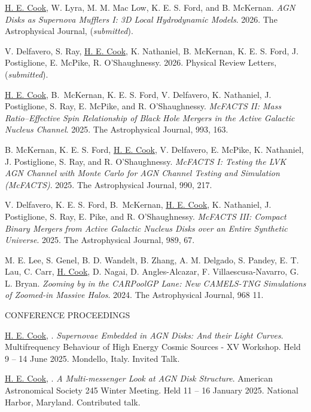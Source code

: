 \hangindent=0.5in \noindent \underline{H. E. Cook}, W. Lyra, M. M. Mac Low, K. E. S. Ford, and B. McKernan. \textit{AGN Disks as Supernova Mufflers I: 3D Local Hydrodynamic Models}. 2026. The Astrophysical Journal, (\textit{submitted}).

\hangindent=0.5in \noindent V. Delfavero, S. Ray, \underline{H. E. Cook}, K. Nathaniel, B. McKernan, K. E. S. Ford, J. Postiglione, E. McPike, R. O'Shaughnessy. 2026. Physical Review Letters, (\textit{submitted}).

\hangindent=0.5in \noindent \underline{H. E. Cook}, B.~McKernan, K. E. S. Ford, V. Delfavero, K. Nathaniel, J. Postiglione, S. Ray, E. McPike, and R. O'Shaughnessy. \textit{McFACTS II: Mass Ratio--Effective Spin Relationship of Black Hole Mergers in the Active Galactic Nucleus Channel}. 2025. The Astrophysical Journal, 993, 163.

\hangindent=0.5in \noindent  B. McKernan, K. E. S. Ford, \underline{H. E. Cook}, V. Delfavero, E. McPike, K. Nathaniel, J. Postiglione, S. Ray, and R. O'Shaughnessy. \textit{McFACTS I: Testing the LVK AGN Channel with Monte Carlo for AGN Channel Testing and Simulation (McFACTS)}. 2025. The Astrophysical Journal, 990, 217.

\hangindent=0.5in \noindent V. Delfavero, K. E. S. Ford, B.~McKernan, \underline{H. E. Cook}, K. Nathaniel, J. Postiglione, S. Ray, E. Pike, and R. O'Shaughnessy. \textit{McFACTS III: Compact Binary Mergers from Active Galactic Nucleus Disks over an Entire Synthetic Universe}. 2025. The Astrophysical Journal, 989, 67.

\hangindent=0.5in \noindent M. E. Lee, S. Genel, B. D. Wandelt, B. Zhang, A. M. Delgado, S. Pandey, E. T. Lau, C. Carr, \underline{H. Cook}, D. Nagai, D. Angles-Alcazar, F. Villaescusa-Navarro, G. L. Bryan. \textit{Zooming by in the CARPoolGP Lane: New CAMELS-TNG Simulations of Zoomed-in Massive Halos}. 2024. The Astrophysical Journal, 968 11.

\begin{center}
CONFERENCE PROCEEDINGS
\end{center}

\hangindent=0.5in \noindent \underline{H. E. Cook}, . \textit{Supernovae Embedded in AGN Disks: And their Light Curves}. Multifrequency Behaviour of High Energy Cosmic Sources - XV Workshop. Held 9 -- 14 June 2025. Mondello, Italy. Invited Talk.

\hangindent=0.5in \noindent \underline{H. E. Cook}, . \textit{A Multi-messenger Look at AGN Disk Structure}. American Astronomical Society 245 Winter Meeting. Held 11 -- 16 January 2025. National Harbor, Maryland. Contributed talk.

